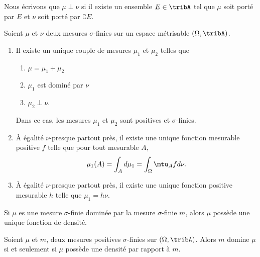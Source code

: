 Nous écrivons que \( \mu\perp\nu\) si il existe un ensemble \( E\in\tribA\) tel que \( \mu\) soit porté par \( E\) et \( \nu\) soit porté par \( \complement E\).

\begin{theorem}     \label{THOooEFVUooGKApaV}
	Soient \( \mu\) et \( \nu\) deux mesures \( \sigma\)-finies sur un espace métrisable \( (\Omega,\tribA)\).
	\begin{enumerate}
		\item
		      Il existe un unique couple de mesures \( \mu_1\) et \( \mu_2\) telles que
		      \begin{enumerate}
			      \item
			            \( \mu=\mu_1+\mu_2\)
			      \item
			            \( \mu_1\) est dominé par \( \nu\)
			      \item
			            \( \mu_2\perp \nu\).
		      \end{enumerate}
		      Dans ce cas, les mesures \( \mu_1\) et \( \mu_2\) sont positives et \( \sigma\)-finies.
		\item
		      À égalité \(  \nu\)-presque partout près, il existe une unique fonction mesurable positive \( f\) telle que pour tout mesurable \( A\),
		      \begin{equation}
			      \mu_1(A)=\int_Ad\mu_1=\int_{\Omega}\mtu_Afd \nu.
		      \end{equation}
		\item
		      À égalité \( \nu\)-presque partout près, il existe une unique fonction positive mesurable \( h\) telle que \( \mu_1=h\nu\).
	\end{enumerate}
\end{theorem}

\begin{corollary}   \label{CorZDkhwS}
	Si \( \mu\) es une mesure \( \sigma\)-finie dominée par la mesure \( \sigma\)-finie \( m\), alors \( \mu\) possède une unique fonction de densité.
\end{corollary}

\begin{corollary}       \label{CorDomDens}
	Soient \( \mu\) et \( m\), deux mesures positives \( \sigma\)-finies sur \( (\Omega,\tribA)\). Alors \( m\) domine \( \mu\) si et seulement si \( \mu\) possède une densité par rapport à \( m\).
\end{corollary}

